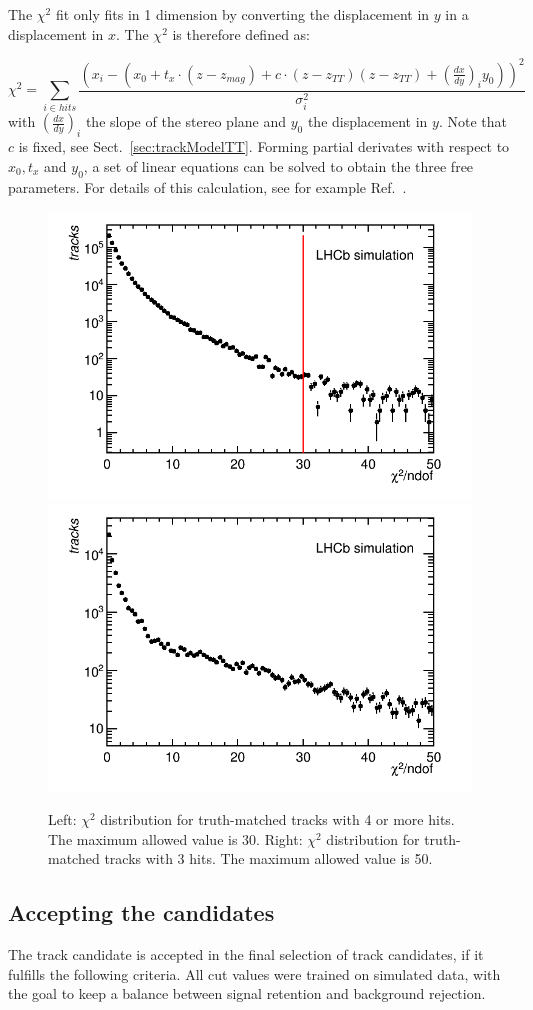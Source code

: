 The $\chi^{2}$ fit only fits in 1 dimension by converting the displacement in
$y$ in a displacement in $x$.
The $\chi^{2}$ is therefore defined as:

\begin{equation}
\chi^{2} = \sum_{i \in hits} \frac{ \left(x_{i} - (x_{0} + t_{x}\cdot(z-z_{mag}) + c \cdot (z - z_{TT})(z - z_{TT}) + \left( \frac{dx}{dy} \right)_{i} y_{0}) \right)^{2}  }{\sigma_{i}^{2}}
\end{equation}
with $\left( \frac{dx}{dy} \right)_{i}$ the slope of the stereo plane and
$y_{0}$ the displacement in $y$. Note that $c$ is fixed, see Sect.~\ref{sec:trackModelTT}.
Forming partial derivates with respect to $x_{0}, t_{x}$ and $y_{0}$, a set of
linear equations can be solved to obtain the three free parameters. For details
of this calculation, see for example Ref.~\cite{Stahl:DiplomaThesis}.

\begin{figure}[!htbp]
 \begin{center}
  \includegraphics[width=0.49\linewidth]{figures/chi2Cut1.png}
  \includegraphics[width=0.49\linewidth]{figures/chi2Cut3Hits1.png}
   \caption{Left: $\chi^{2}$ distribution for truth-matched tracks with 4 or more
   hits. The maximum allowed value is 30. Right: $\chi^{2}$ distribution for
   truth-matched tracks with 3 hits. The maximum allowed value is 50.
   \label{fig:chi2Cuts}}
 \end{center}
\end{figure}

\subsection{Accepting the candidates}
\label{sec:acceptCandidate}
The track candidate is accepted in the final selection of track candidates,
if it fulfills the following criteria. All cut values were trained on simulated data, 
with the goal to keep a balance between signal retention and background rejection. 

